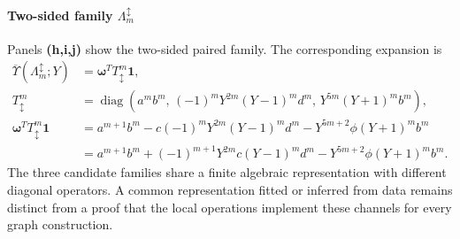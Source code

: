 \documentclass[10pt,twocolumn]{article}
\begin{document}
\paragraph{Two-sided family $\Lambda_m^{\updownarrow}$}
\label{supp:transfer_two_sided}
Panels \textbf{(h,i,j)} show the two-sided paired family. The corresponding expansion is
\begin{equation}
\begin{aligned}
\overline{\Upsilon}(\Lambda_m^{\updownarrow};Y)&=\bm\omega^TT_\updownarrow^m\bm1,\\
T_\updownarrow^m&=\operatorname{diag}\!\left(a^mb^m,\,(-1)^mY^{2m}(Y-1)^md^m,\,Y^{5m}(Y+1)^mb^m\right),\\
\bm\omega^TT_\updownarrow^m\bm1
&=a^{m+1}b^m-c(-1)^mY^{2m}(Y-1)^md^m-Y^{5m+2}\phi(Y+1)^mb^m\\
&=\boxed{a^{m+1}b^m+(-1)^{m+1}Y^{2m}c(Y-1)^md^m-Y^{5m+2}\phi(Y+1)^mb^m}.
\end{aligned}
\label{supp:deriv:eq:updown_family}
\end{equation}
The three candidate families share a finite algebraic representation with different diagonal operators. A common representation fitted or inferred from data remains distinct from a proof that the local operations implement these channels for every graph construction.
\end{document}
